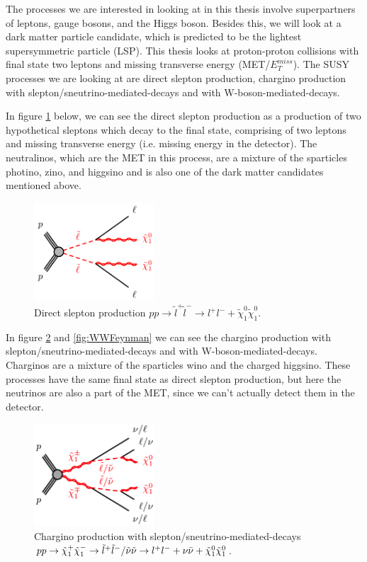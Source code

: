 

The processes we are interested in looking at in this thesis involve superpartners of leptons, gauge bosons, and the Higgs boson. Besides this, we will look at a dark matter particle candidate, which is predicted to be the lightest supersymmetric particle (LSP).  This thesis looks at proton-proton collisions with final state two leptons and missing transverse energy (MET/$E_T^{miss}$). The SUSY processes we are looking at are direct slepton production, chargino production with slepton/sneutrino-mediated-decays and with W-boson-mediated-decays. 


In figure \ref{fig:SlepSlepFeynman} below, we can see the direct slepton production as a production of two hypothetical sleptons which decay to the final state, comprising of two leptons and missing transverse energy (i.e. missing energy in the detector). The neutralinos, which are the MET in this process, are a mixture of the sparticles photino, zino, and higgsino and is also one of the dark matter candidates mentioned above.  
\begin{figure}[H]
    \centering
    \includegraphics[width = 0.4\textwidth]{Figures/FeynmanDiagrams/SlepSlepFeynman.png}
    \caption{Direct slepton production $pp \rightarrow \tilde{l}^+ \tilde{l}^- \rightarrow l^+l^- + \tilde{\chi}_1^0 \tilde{\chi}_1^0$.}
    \label{fig:SlepSlepFeynman}
\end{figure}

In figure \ref{fig:SlepSnuFeynman} and \ref{fig:WWFeynman} we can see the chargino production with  slepton/sneutrino-mediated-decays and with W-boson-mediated-decays. Charginos are a mixture of the sparticles wino and the charged higgsino. These processes have the same final state as direct slepton production, but here the neutrinos are also a part of the MET, since we can't actually detect them in the detector. 
\begin{figure}[H]
    \centering
    \includegraphics[width = 0.4\textwidth]{Figures/FeynmanDiagrams/SlepSnuFeynman.png}
    \caption{Chargino production with slepton/sneutrino-mediated-decays $pp \rightarrow \tilde{\chi}_1^+ \tilde{\chi}_1^- \rightarrow \tilde{l}^+ \tilde{l}^- /\tilde{\nu} \tilde{\nu} \rightarrow l^+l^- + \nu \Bar{\nu} + \tilde{\chi}_1^0 \tilde{\chi}_1^0$.}
    \label{fig:SlepSnuFeynman}
\end{figure}

